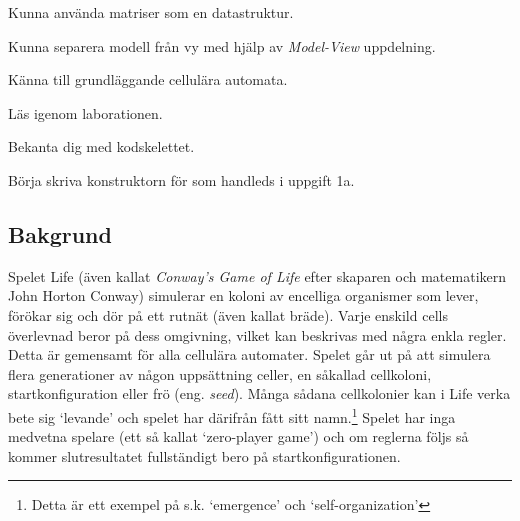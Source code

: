 



\begin{Goals}
    \item Kunna använda matriser som en datastruktur.
    \item Kunna separera modell från vy med hjälp av \emph{Model-View} uppdelning.
    \item Känna till grundläggande cellulära automata. %
\end{Goals}


\begin{Preparations}
    \item Läs igenom laborationen.
    \item Bekanta dig med kodskelettet.
    \item Börja skriva konstruktorn för  som handleds i uppgift 1a.
\end{Preparations}

\subsection{Bakgrund}

Spelet Life (även kallat \emph{Conway's Game of Life} efter skaparen och matematikern John Horton Conway) simulerar en koloni av encelliga organismer som lever, förökar sig och dör på ett rutnät (även kallat bräde). Varje enskild cells överlevnad beror på dess omgivning, vilket kan beskrivas med några enkla regler. Detta är gemensamt för alla cellulära automater. Spelet går ut på att simulera flera generationer av någon uppsättning celler, en såkallad cellkoloni, startkonfiguration eller frö (eng. \textit{seed}). Många sådana cellkolonier kan i Life verka bete sig `levande' och spelet har därifrån fått sitt namn.\footnote{Detta är ett exempel på s.k. `emergence' och `self-organization'} Spelet har inga medvetna spelare (ett så kallat `zero-player game') och om reglerna följs så kommer slutresultatet fullständigt bero på startkonfigurationen.

